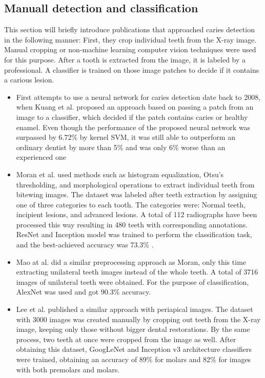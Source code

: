 \subsection{Manuall detection and classification}
This section will briefly introduce publications that approached caries detection in the following manner: First, they crop individual teeth from the X-ray image. Manual cropping or non-machine learning computer vision techniques were used for this purpose. After a tooth is extracted from the image, it is labeled by a professional. A classifier is trained on those image patches to decide if it contains a carious lesion.
\begin{itemize}
    \item First attempts to use a neural network for caries detection date back to 2008, when Kuang et al. \cite{Kuang2008} proposed an approach based on passing a patch from an image to a classifier, which decided if the patch contains caries or healthy enamel. Even though the performance of the proposed neural network was surpassed by 6.72\% by kernel SVM, it was still able to outperform an ordinary dentist by more than 5\% and was only 6\% worse than an experienced one
    \item Moran et al.\cite{Moran2021} used methods such as histogram equalization, Otsu's thresholding, and morphological operations to extract individual teeth from bitewing images. The dataset was labeled after teeth extraction by assigning one of three categories to each tooth. The categories were: Normal teeth, incipient lesions, and advanced lesions. A total of 112 radiographs have been processed this way resulting in 480 teeth with corresponding annotations. ResNet and Inception model was trained to perform the classification task, and the best-achieved accuracy was 73.3\% \cite{Moran2021}.
    \item{Mao at al. \cite{Mao2021}} did a similar preprocessing approach as Moran, only this time extracting unilateral teeth images instead of the whole teeth. A total of 3716 images of unilateral teeth were obtained. For the purpose of classification, AlexNet was used and got 90.3\% accuracy.
    \item{Lee et al. \cite{Lee2018}} published a similar approach with periapical images. The dataset with 3000 images was created manually by cropping out teeth from the X-ray image, keeping only those without bigger dental restorations. By the same process, two teeth at once were cropped from the image as well. After obtaining this dataset, GoogLeNet and Inception v3 architecture classifiers were trained, obtaining an accuracy of 89\%  for molars and 82\% for images with both premolars and molars.
\end{itemize}


